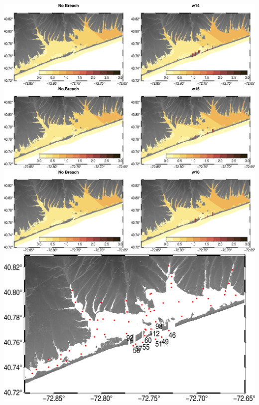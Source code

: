 \includegraphics[width=\textwidth]{images/fgmax/w14_fgmax_no_lines.png}
\includegraphics[width=\textwidth]{images/fgmax/w15_fgmax_no_lines.png}
\includegraphics[width=\textwidth]{images/fgmax/w16_fgmax_no_lines.png}
\includegraphics[width=\textwidth]{images/nearest_gauges_map.png}
